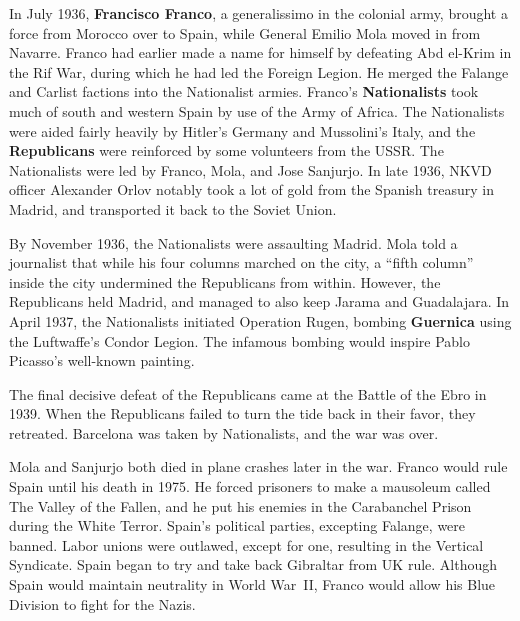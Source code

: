 In July 1936, \textbf{Francisco Franco}, a generalissimo in the colonial army,
brought a force from Morocco over to Spain, while General Emilio Mola moved in from Navarre.
Franco had earlier made a name for himself by defeating Abd el-Krim in the Rif War,
during which he had led the Foreign Legion.
He merged the Falange and Carlist factions into the Nationalist armies.
Franco's \textbf{Nationalists} took much of south and western Spain by use of the Army of Africa.
The Nationalists were aided fairly heavily by Hitler's Germany and Mussolini's Italy,
and the \textbf{Republicans} were reinforced by some volunteers from the USSR\@.
The Nationalists were led by Franco, Mola, and Jose Sanjurjo.
In late 1936, NKVD officer Alexander Orlov notably took a lot of gold from the Spanish treasury in Madrid,
and transported it back to the Soviet Union.

By November 1936, the Nationalists were assaulting Madrid.
Mola told a journalist that while his four columns marched on the city,
a ``fifth column'' inside the city undermined the Republicans from within.
However, the Republicans held Madrid, and managed to also keep Jarama and Guadalajara.
In April 1937, the Nationalists initiated Operation Rugen,
bombing \textbf{Guernica} using the Luftwaffe's Condor Legion.
The infamous bombing would inspire Pablo Picasso's well-known painting.

The final decisive defeat of the Republicans came at the Battle of the Ebro in 1939.
When the Republicans failed to turn the tide back in their favor, they retreated.
Barcelona was taken by Nationalists, and the war was over.

Mola and Sanjurjo both died in plane crashes later in the war.
Franco would rule Spain until his death in 1975.
He forced prisoners to make a mausoleum called The Valley of the Fallen,
and he put his enemies in the Carabanchel Prison during the White Terror.
Spain's political parties, excepting Falange, were banned.
Labor unions were outlawed, except for one, resulting in the Vertical Syndicate.
Spain began to try and take back Gibraltar from UK rule.
Although Spain would maintain neutrality in World War~II, Franco would allow his Blue Division to fight for the Nazis.
